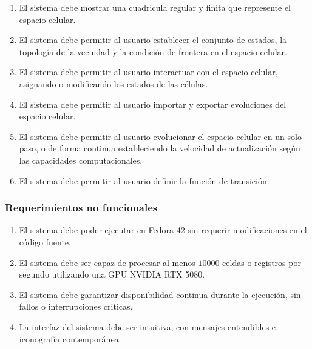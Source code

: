 \begin{enumerate}[label*=RF\arabic*]
	\item El sistema debe mostrar una cuadricula regular y finita que represente el espacio celular. 
	\item El sistema debe permitir al usuario establecer el conjunto de estados, la topología de la vecindad y la condición de frontera en el espacio celular.
	\item El sistema debe permitir al usuario interactuar con el espacio celular, asignando o modificando los estados de las células.
	\item El sistema debe permitir al usuario importar y exportar evoluciones del espacio celular.
	\item El sistema debe permitir al usuario evolucionar el espacio celular en un solo paso, o de forma continua estableciendo la velocidad de actualización según las capacidades computacionales.
	\item El sistema debe permitir al usuario definir la función de transición.

	
\end{enumerate}

\subsubsection{Requerimientos no funcionales}

\begin{enumerate}[label*=RNF\arabic*]
	\item El sistema debe poder ejecutar en Fedora 42 sin requerir modificaciones en el código fuente.
	\item El sistema debe ser capaz de procesar al menos $10000$ celdas o registros por segundo utilizando una GPU NVIDIA RTX 5080.
	\item El sistema debe garantizar disponibilidad continua durante la ejecución, sin fallos o interrupciones criticas.
	\item La interfaz del sistema debe ser intuitiva, con mensajes entendibles e iconografía contemporánea.
\end{enumerate}

